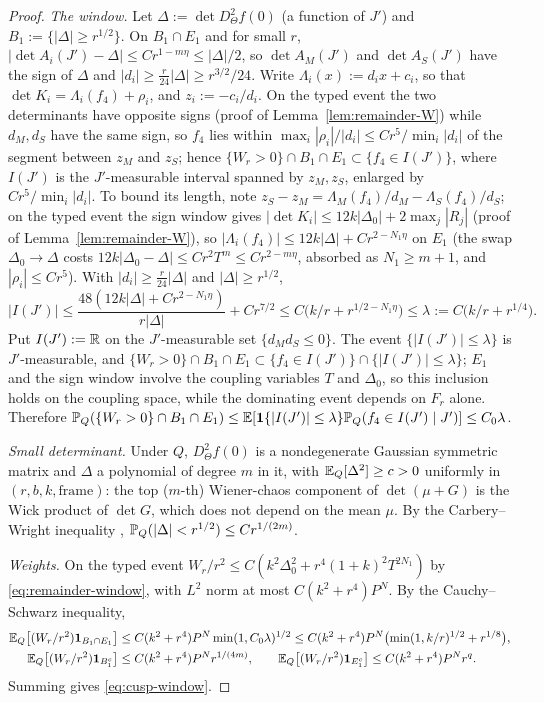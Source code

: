 \begin{proof}
\emph{The window.} Let $\Delta:=\det D_\Theta^2f(0)$ (a function of $J'$) and $B_1:=\{|\Delta|\ge r^{1/2}\}$. On $B_1\cap E_1$ and for small $r$, $|\det A_i(J')-\Delta|\le Cr^{1-m\eta}\le|\Delta|/2$, so $\det A_M(J')$ and $\det A_S(J')$ have the sign of $\Delta$ and $|d_i|\ge\frac r{24}|\Delta|\ge r^{3/2}/24$. Write $\Lambda_i(x):=d_ix+c_i$, so that $\det K_i=\Lambda_i(f_4)+\rho_i$, and $z_i:=-c_i/d_i$. On the typed event the two determinants have opposite signs (proof of Lemma~\ref{lem:remainder-W}) while $d_M,d_S$ have the same sign, so $f_4$ lies within $\max_i|\rho_i|/|d_i|\le Cr^5/\min_i|d_i|$ of the segment between $z_M$ and $z_S$; hence $\{W_r>0\}\cap B_1\cap E_1\subset\{f_4\in I(J')\}$, where $I(J')$ is the $J'$-measurable interval spanned by $z_M,z_S$, enlarged by $Cr^5/\min_i|d_i|$. To bound its length, note $z_S-z_M=\Lambda_M(f_4)/d_M-\Lambda_S(f_4)/d_S$; on the typed event the sign window gives $|\det K_i|\le12k|\Delta_0|+2\max_j|R_j|$ (proof of Lemma~\ref{lem:remainder-W}), so $|\Lambda_i(f_4)|\le12k|\Delta|+Cr^{2-N_1\eta}$ on $E_1$ (the swap $\Delta_0\to\Delta$ costs $12k|\Delta_0-\Delta|\le Cr^2T^m\le Cr^{2-m\eta}$, absorbed as $N_1\ge m+1$, and $|\rho_i|\le Cr^5$). With $|d_i|\ge\frac r{24}|\Delta|$ and $|\Delta|\ge r^{1/2}$,
\[
|I(J')|\le\frac{48(12k|\Delta|+Cr^{2-N_1\eta})}{r|\Delta|}+Cr^{7/2}\le C\bigl(k/r+r^{1/2-N_1\eta}\bigr)\le\lambda:=C\bigl(k/r+r^{1/4}\bigr).
\]
Put $I(J'):=\mathbb R$ on the $J'$-measurable set $\{d_Md_S\le0\}$. The event $\{|I(J')|\le\lambda\}$ is $J'$-measurable, and $\{W_r>0\}\cap B_1\cap E_1\subset\{f_4\in I(J')\}\cap\{|I(J')|\le\lambda\}$; $E_1$ and the sign window involve the coupling variables $T$ and $\Delta_0$, so this inclusion holds on the coupling space, while the dominating event depends on $F_r$ alone. Therefore $\mathbb P_Q(\{W_r>0\}\cap B_1\cap E_1)\le\mathbb E[\mathbf 1\{|I(J')|\le\lambda\}\mathbb P_Q(f_4\in I(J')\mid J')]\le C_0\lambda$.

\emph{Small determinant.} Under $Q$, $D_\Theta^2f(0)$ is a nondegenerate Gaussian symmetric matrix and $\Delta$ a polynomial of degree $m$ in it, with $\mathbb E_Q[\Delta^2]\ge c>0$ uniformly in $(r,b,k,\text{frame})$: the top ($m$-th) Wiener-chaos component of $\det(\mu+G)$ is the Wick product of $\det G$, which does not depend on the mean $\mu$. By the Carbery--Wright inequality \cite{CarberyWright}, $\mathbb P_Q(|\Delta|<r^{1/2})\le Cr^{1/(2m)}$.

\emph{Weights.} On the typed event $W_r/r^2\le C(k^2\Delta_0^2+r^4(1+k)^2T^{2N_1})$ by \eqref{eq:remainder-window}, with $L^2$ norm at most $C(k^2+r^4)P^N$. By the Cauchy--Schwarz inequality,
\[
\begin{aligned}
\mathbb E_Q\bigl[(W_r/r^2)\mathbf 1_{B_1\cap E_1}\bigr]&\le C(k^2+r^4)P^N\min(1,C_0\lambda)^{1/2}\le C(k^2+r^4)P^N\bigl(\min(1,k/r)^{1/2}+r^{1/8}\bigr),\\
\mathbb E_Q\bigl[(W_r/r^2)\mathbf 1_{B_1^c}\bigr]&\le C(k^2+r^4)P^Nr^{1/(4m)},\qquad \mathbb E_Q\bigl[(W_r/r^2)\mathbf 1_{E_1^c}\bigr]\le C(k^2+r^4)P^Nr^q .
\end{aligned}
\]
Summing gives \eqref{eq:cusp-window}.
\end{proof}

